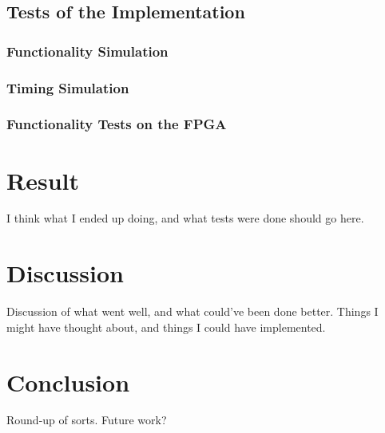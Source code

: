 \documentclass{article}
\begin{document}
\subsection{Tests of the Implementation}
\label{sec:tests}

\subsubsection{Functionality Simulation}
\label{subsec:funcsim}

\subsubsection{Timing Simulation}
\label{subsec:timingsim}

\subsubsection{Functionality Tests on the FPGA}
\label{subsec:funcfpga}

\section{Result}
\label{sec:result}
I think what I ended up doing, and what tests were done should go here.

\section{Discussion}
\label{sec:discussion}
Discussion of what went well, and what could've been done better. Things I might have thought about, and things I could have implemented.

\section{Conclusion}
\label{sec:conclusion}
Round-up of sorts. Future work?
\end{document}
